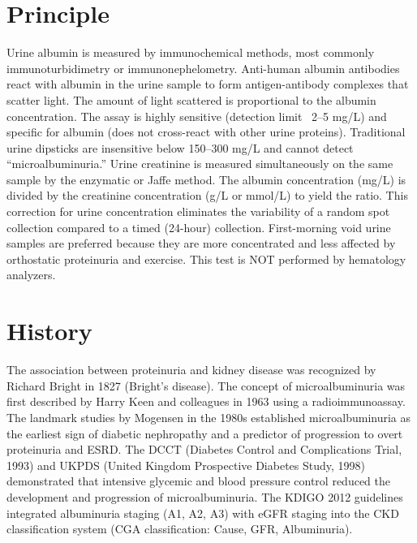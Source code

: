 \section*{Principle}
Urine albumin is measured by immunochemical methods, most commonly immunoturbidimetry or immunonephelometry. Anti-human albumin antibodies react with albumin in the urine sample to form antigen-antibody complexes that scatter light. The amount of light scattered is proportional to the albumin concentration. The assay is highly sensitive (detection limit ~2--5 mg/L) and specific for albumin (does not cross-react with other urine proteins). Traditional urine dipsticks are insensitive below 150--300 mg/L and cannot detect ``microalbuminuria.'' Urine creatinine is measured simultaneously on the same sample by the enzymatic or Jaffe method. The albumin concentration (mg/L) is divided by the creatinine concentration (g/L or mmol/L) to yield the ratio. This correction for urine concentration eliminates the variability of a random spot collection compared to a timed (24-hour) collection. First-morning void urine samples are preferred because they are more concentrated and less affected by orthostatic proteinuria and exercise. This test is NOT performed by hematology analyzers.

\section*{History}
The association between proteinuria and kidney disease was recognized by Richard Bright in 1827 (Bright's disease). The concept of microalbuminuria was first described by Harry Keen and colleagues in 1963 using a radioimmunoassay. The landmark studies by Mogensen in the 1980s established microalbuminuria as the earliest sign of diabetic nephropathy and a predictor of progression to overt proteinuria and ESRD. The DCCT (Diabetes Control and Complications Trial, 1993) and UKPDS (United Kingdom Prospective Diabetes Study, 1998) demonstrated that intensive glycemic and blood pressure control reduced the development and progression of microalbuminuria. The KDIGO 2012 guidelines integrated albuminuria staging (A1, A2, A3) with eGFR staging into the CKD classification system (CGA classification: Cause, GFR, Albuminuria).

